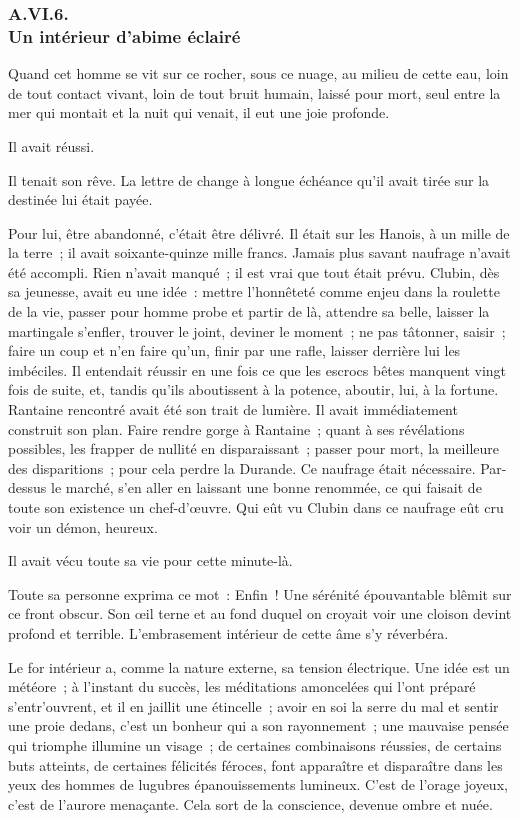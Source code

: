 \documentclass[french,twoside]{book} %
\begin{document}
 \subsubsection[{A.VI.6. Un intérieur d’abime éclairé}]{A.VI.6. \\
Un intérieur d’abime éclairé}
\noindent Quand cet homme se vit sur ce rocher, sous ce nuage, au milieu de cette eau, loin de tout contact vivant, loin de tout bruit humain, laissé pour mort, seul entre la mer qui montait et la nuit qui venait, il eut une joie profonde.\par
Il avait réussi.\par
Il tenait son rêve. La lettre de change à longue échéance qu’il avait tirée sur la destinée lui était payée.\par
Pour lui, être abandonné, c’était être délivré. Il était sur les Hanois, à un mille de la terre ; il avait soixante-quinze mille francs. Jamais plus savant naufrage n’avait été accompli. Rien n’avait manqué ; il est vrai que tout était prévu. Clubin, dès sa jeunesse, avait eu une idée : mettre l’honnêteté comme enjeu dans la roulette de la vie, passer pour homme probe et partir de là, attendre sa belle, laisser la martingale s’enfler, trouver le joint, deviner le moment ; ne pas  tâtonner, saisir ; faire un coup et n’en faire qu’un, finir par une rafle, laisser derrière lui les imbéciles. Il entendait réussir en une fois ce que les escrocs bêtes manquent vingt fois de suite, et, tandis qu’ils aboutissent à la potence, aboutir, lui, à la fortune. Rantaine rencontré avait été son trait de lumière. Il avait immédiatement construit son plan. Faire rendre gorge à Rantaine ; quant à ses révélations possibles, les frapper de nullité en disparaissant ; passer pour mort, la meilleure des disparitions ; pour cela perdre la Durande. Ce naufrage était nécessaire. Par-dessus le marché, s’en aller en laissant une bonne renommée, ce qui faisait de toute son existence un chef-d’œuvre. Qui eût vu Clubin dans ce naufrage eût cru voir un démon, heureux.\par
Il avait vécu toute sa vie pour cette minute-là.\par
Toute sa personne exprima ce mot : Enfin ! Une sérénité épouvantable blêmit sur ce front obscur. Son œil terne et au fond duquel on croyait voir une cloison devint profond et terrible. L’embrasement intérieur de cette âme s’y réverbéra.\par
Le for intérieur a, comme la nature externe, sa tension électrique. Une idée est un météore ; à l’instant du succès, les méditations amoncelées qui l’ont préparé s’entr’ouvrent, et il en jaillit une étincelle ; avoir en soi la serre du mal et sentir une proie dedans, c’est un bonheur qui a son rayonnement ; une mauvaise pensée qui triomphe illumine un visage ; de certaines combinaisons réussies, de certains buts atteints, de certaines félicités féroces, font apparaître et disparaître  dans les yeux des hommes de lugubres épanouissements lumineux. C’est de l’orage joyeux, c’est de l’aurore menaçante. Cela sort de la conscience, devenue ombre et nuée.\par
\end{document}
